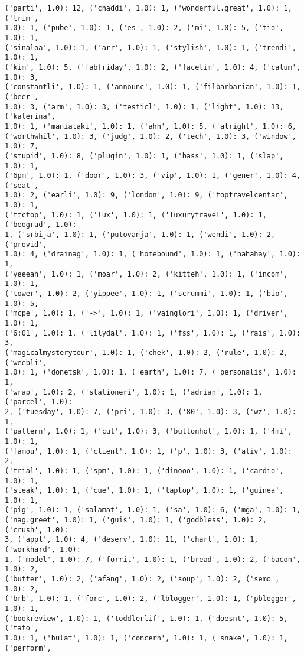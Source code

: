 \documentclass[11pt]{article}
\begin{document}
\begin{Verbatim}[commandchars=\\\{\}]
('parti', 1.0): 12, ('chaddi', 1.0): 1, ('wonderful.great', 1.0): 1, ('trim',
1.0): 1, ('pube', 1.0): 1, ('es', 1.0): 2, ('mi', 1.0): 5, ('tio', 1.0): 1,
('sinaloa', 1.0): 1, ('arr', 1.0): 1, ('stylish', 1.0): 1, ('trendi', 1.0): 1,
('kim', 1.0): 5, ('fabfriday', 1.0): 2, ('facetim', 1.0): 4, ('calum', 1.0): 3,
('constantli', 1.0): 1, ('announc', 1.0): 1, ('filbarbarian', 1.0): 1, ('beer',
1.0): 3, ('arm', 1.0): 3, ('testicl', 1.0): 1, ('light', 1.0): 13, ('katerina',
1.0): 1, ('maniataki', 1.0): 1, ('ahh', 1.0): 5, ('alright', 1.0): 6,
('worthwhil', 1.0): 3, ('judg', 1.0): 2, ('tech', 1.0): 3, ('window', 1.0): 7,
('stupid', 1.0): 8, ('plugin', 1.0): 1, ('bass', 1.0): 1, ('slap', 1.0): 1,
('6pm', 1.0): 1, ('door', 1.0): 3, ('vip', 1.0): 1, ('gener', 1.0): 4, ('seat',
1.0): 2, ('earli', 1.0): 9, ('london', 1.0): 9, ('toptravelcentar', 1.0): 1,
('ttctop', 1.0): 1, ('lux', 1.0): 1, ('luxurytravel', 1.0): 1, ('beograd', 1.0):
1, ('srbija', 1.0): 1, ('putovanja', 1.0): 1, ('wendi', 1.0): 2, ('provid',
1.0): 4, ('drainag', 1.0): 1, ('homebound', 1.0): 1, ('hahahay', 1.0): 1,
('yeeeah', 1.0): 1, ('moar', 1.0): 2, ('kitteh', 1.0): 1, ('incom', 1.0): 1,
('tower', 1.0): 2, ('yippee', 1.0): 1, ('scrummi', 1.0): 1, ('bio', 1.0): 5,
('mcpe', 1.0): 1, ('->', 1.0): 1, ('vainglori', 1.0): 1, ('driver', 1.0): 1,
('6:01', 1.0): 1, ('lilydal', 1.0): 1, ('fss', 1.0): 1, ('rais', 1.0): 3,
('magicalmysterytour', 1.0): 1, ('chek', 1.0): 2, ('rule', 1.0): 2, ('weebli',
1.0): 1, ('donetsk', 1.0): 1, ('earth', 1.0): 7, ('personalis', 1.0): 1,
('wrap', 1.0): 2, ('stationeri', 1.0): 1, ('adrian', 1.0): 1, ('parcel', 1.0):
2, ('tuesday', 1.0): 7, ('pri', 1.0): 3, ('80', 1.0): 3, ('wz', 1.0): 1,
('pattern', 1.0): 1, ('cut', 1.0): 3, ('buttonhol', 1.0): 1, ('4mi', 1.0): 1,
('famou', 1.0): 1, ('client', 1.0): 1, ('p', 1.0): 3, ('aliv', 1.0): 2,
('trial', 1.0): 1, ('spm', 1.0): 1, ('dinooo', 1.0): 1, ('cardio', 1.0): 1,
('steak', 1.0): 1, ('cue', 1.0): 1, ('laptop', 1.0): 1, ('guinea', 1.0): 1,
('pig', 1.0): 1, ('salamat', 1.0): 1, ('sa', 1.0): 6, ('mga', 1.0): 1,
('nag.greet', 1.0): 1, ('guis', 1.0): 1, ('godbless', 1.0): 2, ('crush', 1.0):
3, ('appl', 1.0): 4, ('deserv', 1.0): 11, ('charl', 1.0): 1, ('workhard', 1.0):
1, ('model', 1.0): 7, ('forrit', 1.0): 1, ('bread', 1.0): 2, ('bacon', 1.0): 2,
('butter', 1.0): 2, ('afang', 1.0): 2, ('soup', 1.0): 2, ('semo', 1.0): 2,
('brb', 1.0): 1, ('forc', 1.0): 2, ('lblogger', 1.0): 1, ('pblogger', 1.0): 1,
('bookreview', 1.0): 1, ('toddlerlif', 1.0): 1, ('doesnt', 1.0): 5, ('tato',
1.0): 1, ('bulat', 1.0): 1, ('concern', 1.0): 1, ('snake', 1.0): 1, ('perform',

\end{Verbatim}
\end{document}
